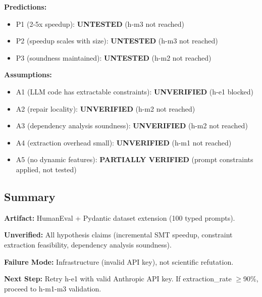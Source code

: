 \textbf{Predictions:}
\begin{itemize}
\item P1 (2-5x speedup): \textbf{UNTESTED} (h-m3 not reached)
\item P2 (speedup scales with size): \textbf{UNTESTED} (h-m3 not reached)
\item P3 (soundness maintained): \textbf{UNTESTED} (h-m2 not reached)
\end{itemize}

\textbf{Assumptions:}
\begin{itemize}
\item A1 (LLM code has extractable constraints): \textbf{UNVERIFIED} (h-e1 blocked)
\item A2 (repair locality): \textbf{UNVERIFIED} (h-m2 not reached)
\item A3 (dependency analysis soundness): \textbf{UNVERIFIED} (h-m2 not reached)
\item A4 (extraction overhead small): \textbf{UNVERIFIED} (h-m1 not reached)
\item A5 (no dynamic features): \textbf{PARTIALLY VERIFIED} (prompt constraints applied, not tested)
\end{itemize}

\subsection{Summary}

\textbf{Artifact:} HumanEval + Pydantic dataset extension (100 typed prompts).

\textbf{Unverified:} All hypothesis claims (incremental SMT speedup, constraint extraction feasibility, dependency analysis soundness).

\textbf{Failure Mode:} Infrastructure (invalid API key), not scientific refutation.

\textbf{Next Step:} Retry h-e1 with valid Anthropic API key. If extraction\_rate $\geq$90\%, proceed to h-m1-m3 validation.
